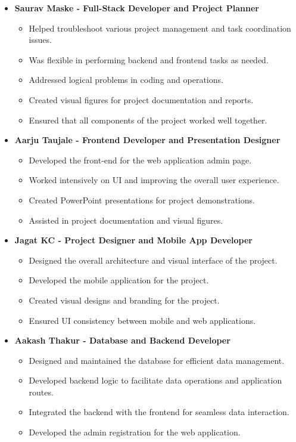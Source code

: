 \documentclass[a4paper,14pt]{article}
\begin{document}
{{{{{{{\begin{itemize}
				\item \textbf{Saurav Maske - Full-Stack Developer and Project Planner}
				\begin{itemize}
					\item Helped troubleshoot various project management and task coordination issues.
					\item Was flexible in performing backend and frontend tasks as needed.
					\item Addressed logical problems in coding and operations.
					\item Created visual figures for project documentation and reports.
					\item Ensured that all components of the project worked well together.
				\end{itemize}
				
				\item \textbf{Aarju Taujale - Frontend Developer and Presentation Designer}
				\begin{itemize}
					\item Developed the front-end for the web application admin page.
					\item Worked intensively on UI and improving the overall user experience.
					\item Created PowerPoint presentations for project demonstrations.
					\item Assisted in project documentation and visual figures.
				\end{itemize}
				
				\item \textbf{Jagat KC - Project Designer and Mobile App Developer}
				\begin{itemize}
					\item Designed the overall architecture and visual interface of the project.
					\item Developed the mobile application for the project.
					\item Created visual designs and branding for the project.
					\item Ensured UI consistency between mobile and web applications.
				\end{itemize}
				
				\item \textbf{Aakash Thakur - Database and Backend Developer}
				\begin{itemize}
					\item Designed and maintained the database for efficient data management.
					\item Developed backend logic to facilitate data operations and application routes.
					\item Integrated the backend with the frontend for seamless data interaction.
					\item Developed the admin registration for the web application.
				\end{itemize}
				

\end{itemize}}}}}}}}
\end{document}
